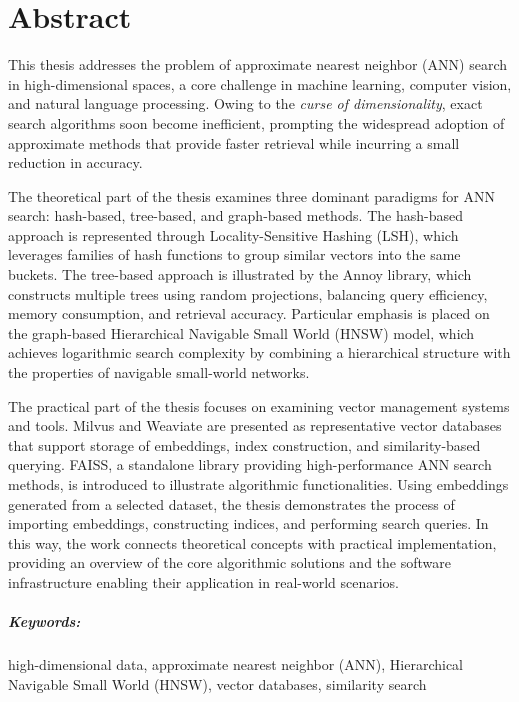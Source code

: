 \pagebreak
\thispagestyle{plain}

\section*{Abstract}

This thesis addresses the problem of approximate nearest neighbor (ANN) search in high-dimensional spaces, a core challenge in machine learning, computer vision, and natural language processing. Owing to the \textit{curse of dimensionality}, exact search algorithms soon become inefficient, prompting the widespread adoption of approximate methods that provide faster retrieval while incurring a small reduction in accuracy.

The theoretical part of the thesis examines three dominant paradigms for ANN search: hash-based, tree-based, and graph-based methods. The hash-based approach is represented through Locality-Sensitive Hashing (LSH), which leverages families of hash functions to group similar vectors into the same buckets. The tree-based approach is illustrated by the Annoy library, which constructs multiple trees using random projections, balancing query efficiency, memory consumption, and retrieval accuracy. Particular emphasis is placed on the graph-based Hierarchical Navigable Small World (HNSW) model, which achieves logarithmic search complexity by combining a hierarchical structure with the properties of navigable small-world networks.

The practical part of the thesis focuses on examining vector management systems and tools. Milvus and Weaviate are presented as representative vector databases that support storage of embeddings, index construction, and similarity-based querying. FAISS, a standalone library providing high-performance ANN search methods, is introduced to illustrate algorithmic functionalities. Using embeddings generated from a selected dataset, the thesis demonstrates the process of importing embeddings, constructing indices, and performing search queries. In this way, the work connects theoretical concepts with practical implementation, providing an overview of the core algorithmic solutions and the software infrastructure enabling their application in real-world scenarios.

\subparagraph{Keywords:}

high-dimensional data, approximate nearest neighbor (ANN), Hierarchical Navigable Small World (HNSW), vector databases, similarity search